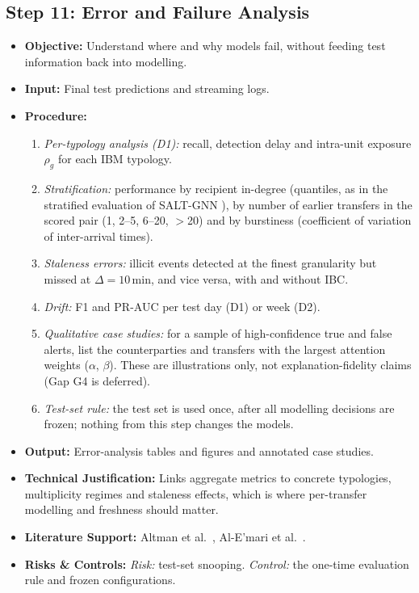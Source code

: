 \documentclass[11pt,a4paper]{article}
\begin{document}
\subsection{Step 11: Error and Failure Analysis}
\begin{itemize}[leftmargin=*]
    \item \textbf{Objective:} Understand where and why models fail, without feeding test information back into modelling.
    \item \textbf{Input:} Final test predictions and streaming logs.
    \item \textbf{Procedure:}
    \begin{enumerate}[leftmargin=*]
        \item \textit{Per-typology analysis (D1):} recall, detection delay and intra-unit exposure $\rho_g$ for each IBM typology.
        \item \textit{Stratification:} performance by recipient in-degree (quantiles, as in the stratified evaluation of SALT-GNN \cite{losavio2026saltgnn}), by number of earlier transfers in the scored pair (1, 2--5, 6--20, $>$20) and by burstiness (coefficient of variation of inter-arrival times).
        \item \textit{Staleness errors:} illicit events detected at the finest granularity but missed at $\Delta=10$\,min, and vice versa, with and without IBC.
        \item \textit{Drift:} F1 and PR-AUC per test day (D1) or week (D2).
        \item \textit{Qualitative case studies:} for a sample of high-confidence true and false alerts, list the counterparties and transfers with the largest attention weights ($\alpha$, $\beta$). These are illustrations only, not explanation-fidelity claims (Gap G4 is deferred).
        \item \textit{Test-set rule:} the test set is used once, after all modelling decisions are frozen; nothing from this step changes the models.
    \end{enumerate}
    \item \textbf{Output:} Error-analysis tables and figures and annotated case studies.
    \item \textbf{Technical Justification:} Links aggregate metrics to concrete typologies, multiplicity regimes and staleness effects, which is where per-transfer modelling and freshness should matter.
    \item \textbf{Literature Support:} Altman et al.\ \cite{altman2023ibmaml}, Al-E'mari et al.\ \cite{alemari2026explainable}.
    \item \textbf{Risks \& Controls:} \textit{Risk:} test-set snooping. \textit{Control:} the one-time evaluation rule and frozen configurations.
\end{itemize}
\end{document}
